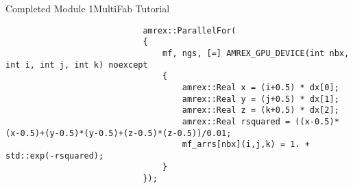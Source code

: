 \documentclass[\string~/GitHub/sthlmNordBeamerTheme/sthlmNordLightDemo.tex]{subfiles}
\begin{document}
\begin{frame}{Completed Module 1}{MultiFab Tutorial}
\begin{itemize}
\begin{center}
\begin{verbatim}
                            amrex::ParallelFor(
                            {
                                mf, ngs, [=] AMREX_GPU_DEVICE(int nbx, int i, int j, int k) noexcept 
                                {
                                    amrex::Real x = (i+0.5) * dx[0];
                                    amrex::Real y = (j+0.5) * dx[1];
                                    amrex::Real z = (k+0.5) * dx[2];
                                    amrex::Real rsquared = ((x-0.5)*(x-0.5)+(y-0.5)*(y-0.5)+(z-0.5)*(z-0.5))/0.01;
                                    mf_arrs[nbx](i,j,k) = 1. + std::exp(-rsquared);
                                }
                            });
                    \end{verbatim}
                \end{center}
	\end{itemize}
 
\end{frame}
\end{document}
